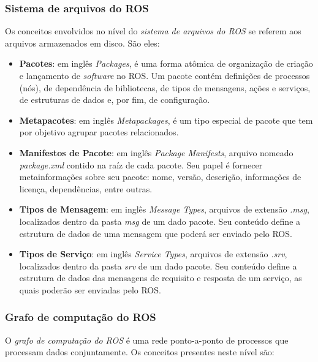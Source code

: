             \subsubsection{Sistema de arquivos do ROS} \label{subsubsec:ros_arquivos}
                Os conceitos envolvidos no nível do \textit{sistema de arquivos do ROS} se referem aos arquivos armazenados em disco. São eles:
                
                \begin{itemize}
                    \item \textbf{Pacotes}: em inglês \textit{Packages}, é uma forma atômica de organização de criação e lançamento de \textit{software} no ROS. Um pacote contém definições de processos (nós), de dependência de bibliotecas, de tipos de mensagens, ações e serviços, de estruturas de dados e, por fim, de configuração. 
                    
                    \item \textbf{Metapacotes}: em inglês \textit{Metapackages}, é um tipo especial de pacote que tem por objetivo agrupar pacotes relacionados.
                    
                    \item \textbf{Manifestos de Pacote}: em inglês \textit{Package Manifests}, arquivo nomeado \textit{package.xml} contido na raíz de cada pacote. Seu papel é fornecer metainformações sobre seu pacote: nome, versão, descrição, informações de licença, dependências, entre outras. 
                    
                    \item \textbf{Tipos de Mensagem}: em inglês \textit{Message Types}, arquivos de extensão \textit{.msg}, localizados dentro da pasta \textit{msg} de um dado pacote. Seu conteúdo define a estrutura de dados de uma mensagem que poderá ser enviado pelo ROS.
                    
                    \item \textbf{Tipos de Serviço}: em inglês \textit{Service Types}, arquivos de extensão \textit{.srv}, localizados dentro da pasta \textit{srv} de um dado pacote. Seu conteúdo define a estrutura de dados das mensagens de requisito e resposta de um serviço, as quais poderão ser enviadas pelo ROS.
                \end{itemize}
            
            \subsubsection{Grafo de computação do ROS} \label{subsubsec:ros_grafo}
                O \textit{grafo de computação do ROS} é uma rede ponto-a-ponto de processos que processam dados conjuntamente. Os conceitos presentes neste nível são:
                
